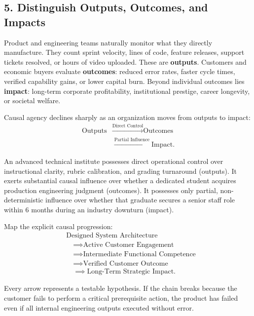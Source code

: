 \subsection*{5. Distinguish Outputs, Outcomes, and Impacts}

Product and engineering teams naturally monitor what they directly manufacture. They count sprint velocity, lines of code, feature releases, support tickets resolved, or hours of video uploaded. These are \textbf{outputs}. Customers and economic buyers evaluate \textbf{outcomes}: reduced error rates, faster cycle times, verified capability gains, or lower capital burn. Beyond individual outcomes lies \textbf{impact}: long-term corporate profitability, institutional prestige, career longevity, or societal welfare.

Causal agency declines sharply as an organization moves from outputs to impact:
\begin{equation}
\begin{aligned}
\text{Outputs} &\xrightarrow{\text{Direct Control}} \text{Outcomes} \\
&\xrightarrow{\text{Partial Influence}} \text{Impact}.
\end{aligned}
\end{equation}

An advanced technical institute possesses direct operational control over instructional clarity, rubric calibration, and grading turnaround (outputs). It exerts substantial causal influence over whether a dedicated student acquires production engineering judgment (outcomes). It possesses only partial, non-deterministic influence over whether that graduate secures a senior staff role within 6 months during an industry downturn (impact).

Map the explicit causal progression:
\begin{equation}
\begin{aligned}
&\text{Designed System Architecture} \\
&\quad \implies \text{Active Customer Engagement} \\
&\quad \implies \text{Intermediate Functional Competence} \\
&\quad \implies \text{Verified Customer Outcome} \\
&\quad \implies \text{Long-Term Strategic Impact}.
\end{aligned}
\end{equation}

Every arrow represents a testable hypothesis. If the chain breaks because the customer fails to perform a critical prerequisite action, the product has failed even if all internal engineering outputs executed without error.

